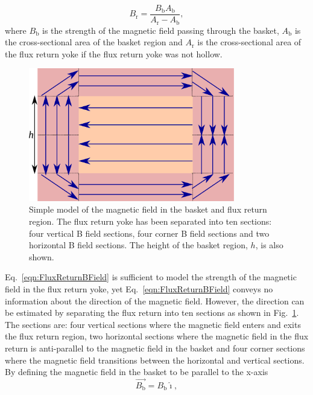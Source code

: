 \begin{equation}
  B_{\textrm{r}} = \frac{B_{\textrm{b}}A_{\textrm{b}}}{A_{\textrm{r}} - A_{\textrm{b}}},
  \label{eqn:FluxReturnBField}
\end{equation}
where $B_{\textrm{b}}$ is the strength of the magnetic field passing through the basket, $A_{\textrm{b}}$ is the cross-sectional area of the basket region and $A_{\textrm{r}}$ is the cross-sectional area of the flux return yoke if the flux return yoke was not hollow.
\newline
\newline
\begin{figure}
  \centering
  \includegraphics[width=9cm]{images/magnetic_field/BFieldDiagram}
  \caption{Simple model of the magnetic field in the basket and flux return region.  The flux return yoke has been separated into ten sections: four vertical B field sections, four corner B field sections and two horizontal B field sections.  The height of the basket region, $h$, is also shown.}
  \label{fig:BFieldDiagram}
\end{figure}
Eq.~\ref{eqn:FluxReturnBField} is sufficient to model the strength of the magnetic field in the flux return yoke, yet Eq.~\ref{eqn:FluxReturnBField} conveys no information about the direction of the magnetic field.  However, the direction can be estimated by separating the flux return into ten sections as shown in Fig.~\ref{fig:BFieldDiagram}.  The sections are: four vertical sections where the magnetic field enters and exits the flux return region, two horizontal sections where the magnetic field in the flux return is anti-parallel to the magnetic field in the basket and four corner sections where the magnetic field transitions between the horizontal and vertical sections.  By defining the magnetic field in the basket to be parallel to the x-axis 
\begin{equation}
  \overrightarrow{B_{\textrm{b}}} = {B_{\textrm{b}}}\hat{\imath},
  \label{eqn:BasketBFieldVector}
\end{equation}
